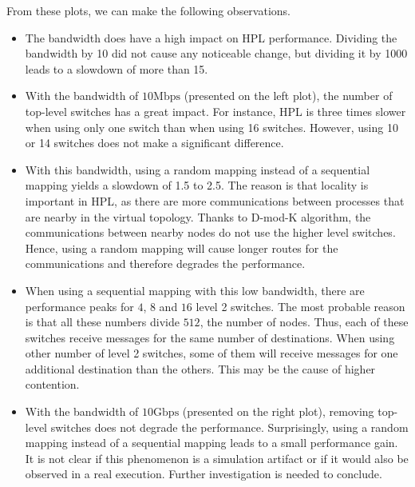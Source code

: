 \documentclass[12pt, a4paper]{memoir}
\begin{document}
From these plots, we can make the following observations.
\begin{itemize}
\item The bandwidth does have a high impact on HPL performance. Dividing the bandwidth by 10 did not cause any noticeable
change, but dividing it by 1000 leads to a slowdown of more than 15.
\item With the bandwidth of \(10 \mathrm{Mbps}\) (presented on the left plot), the number of top-level switches has a
great impact. For instance, HPL is three times slower when using only one switch than when using 16
switches. However, using 10 or 14 switches does not make a significant difference.
\item With this bandwidth, using a random mapping instead of a sequential mapping yields a slowdown of 1.5 to 2.5. The
reason is that locality is important in HPL, as there are more communications between processes that are nearby in
the virtual topology. Thanks to D-mod-K algorithm, the communications between nearby nodes do not use the higher
level switches. Hence, using a random mapping will cause longer routes for the communications and therefore
degrades the performance.
\item When using a sequential mapping with this low bandwidth, there are performance peaks for \(4\), \(8\) and \(16\) level 2
switches. The most probable reason is that all these numbers divide \(512\), the number of nodes. Thus, each of
these switches receive messages for the same number of destinations. When using other number of level 2 switches,
some of them will receive messages for one additional destination than the others. This may be the cause of higher
contention.
\item With the bandwidth of \(10 \mathrm{Gbps}\) (presented on the right plot), removing top-level switches does not
degrade the performance. Surprisingly, using a random mapping instead of a sequential mapping leads to a small
performance gain. It is not clear if this phenomenon is a simulation artifact or if it would also be observed in a
real execution. Further investigation is needed to conclude.
\end{itemize}
\end{document}
